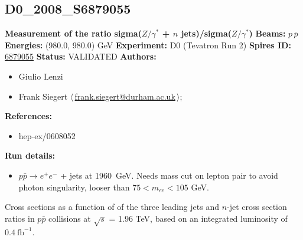\clearpage

\subsection[D0\_2008\_S6879055]{D0\_2008\_S6879055\,\cite{Abazov:2006gs}}
\textbf{Measurement of the ratio sigma($Z/\gamma^*$ + $n$ jets)/sigma($Z/\gamma^*$)}\newline
\textbf{Beams:} $p$\,$\bar{p}$ \newline
\textbf{Energies:} (980.0, 980.0) GeV \newline
\textbf{Experiment:} D0 (Tevatron Run 2) \newline
\textbf{Spires ID:} \href{http://www.slac.stanford.edu/spires/find/hep/www?rawcmd=key+6879055}{6879055}\newline
\textbf{Status:} VALIDATED\newline
\textbf{Authors:}
\begin{itemize}
  \item Giulio Lenzi
  \item Frank Siegert $\langle\,$\href{mailto:frank.siegert@durham.ac.uk}{frank.siegert@durham.ac.uk}$\,\rangle$;
\end{itemize}
\textbf{References:}
\begin{itemize}
  \item hep-ex/0608052
\end{itemize}
\textbf{Run details:}
\begin{itemize}

  \item $p \bar{p} \to e^+ e^-$ + jets at 1960~GeV. Needs mass cut on lepton pair to avoid photon singularity, looser than $75 < m_{ee} < 105$ GeV.\end{itemize}

\noindent Cross sections as a function of \pT of the three leading jets and $n$-jet cross section ratios in $p \bar{p}$ collisions at $\sqrt{s}$ = 1.96 TeV, based on an integrated luminosity of $0.4~\text{fb}^{-1}$.

\clearpage


\clearpage

